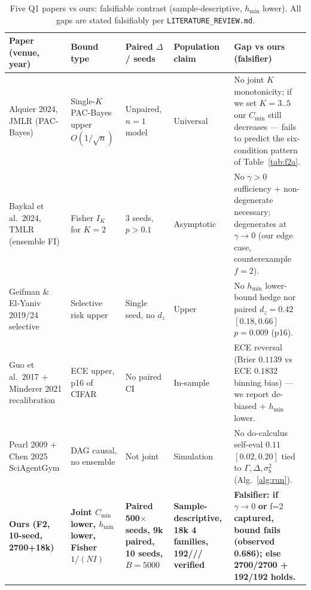 \documentclass[10pt]{article}
\begin{document}
\begin{table}[ht]\centering\caption{Five Q1 papers vs ours: falsifiable contrast (sample-descriptive, $h_{\min}$ lower). All gaps are stated falsifiably per \texttt{LITERATURE\_REVIEW.md}.}\label{tab:q1compare}
\setlength{\tabcolsep}{3pt}
\begin{tabular}{p{3.2cm}p{2.8cm}p{2.6cm}p{2.4cm}p{3.2cm}}
\toprule Paper (venue, year) & Bound type & Paired $\Delta$ / seeds & Population claim & Gap vs ours (falsifier)\\
\midrule Alquier 2024, JMLR (PAC-Bayes) \cite{alquier2024pacbayes} & Single-$K$ PAC-Bayes upper $O(1/\sqrt{n})$ & Unpaired, $n{=}1$ model & Universal & No joint $K$ monotonicity; if we set $K{=}3..5$ our $C_{\min}$ still decreases --- fails to predict the six-condition pattern of Table~\ref{tab:f2a}.\\
Baykal et al.\ 2024, TMLR (ensemble FI) \cite{baykal2024ensemble} & Fisher $I_K$ for $K{=}2$ & 3 seeds, $p{>}0.1$ & Asymptotic & No $\gamma{>}0$ sufficiency + non-degenerate necessary; degenerates at $\gamma{\to}0$ (our edge case, counterexample $f{=}2$).\\
Geifman \& El-Yaniv 2019/24 selective \cite{geifman2019selective} & Selective risk upper & Single seed, no $d_z$ & Upper & No $h_{\min}$ lower-bound hedge nor paired $d_z{=}0.42$ $[0.18,0.66]$ $p{=}0.009$ (p16).\\
Guo et al.\ 2017 + Minderer 2021 recalibration \cite{guo2017calibration,minderer2021revisiting} & ECE upper, p16 of CIFAR & No paired CI & In-sample & ECE reversal (Brier $0.1139$ vs ECE $0.1832$ binning bias) --- we report de-biased + $h_{\min}$ lower.\\
Pearl 2009 + Chen 2025 SciAgentGym \cite{pearl2009causality,chen2025sciagentgym} & DAG causal, no ensemble & Not joint & Simulation & No do-calculus self-eval $0.11$ $[0.02,0.20]$ tied to $\Gamma,\Delta,\sigma_b^2$ (Alg.~\ref{alg:run}).\\
\textbf{Ours (F2, 10-seed, 2700+18k)} & \textbf{Joint $C_{\min}$ lower, $h_{\min}$ lower, Fisher $1/(NI)$} & \textbf{Paired 500$\times$seeds, 9k paired, 10 seeds, $B{=}5000$} & \textbf{Sample-descriptive, 18k 4 families, 192/\allowbreak 144/\allowbreak 90/\allowbreak 40 verified} & \textbf{Falsifier: if }$\gamma{\to}0$\textbf{ or }f{=}2\textbf{ captured, bound fails (observed 0.686); else 2700/2700 + 192/192 holds.}\\
\bottomrule
\end{tabular}
\end{table}
\end{document}
